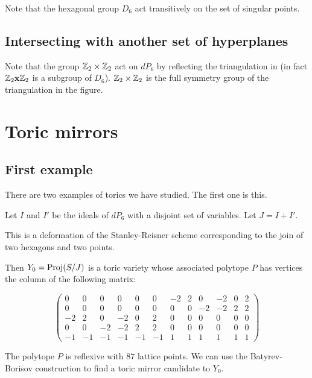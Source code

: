 \documentclass[11pt, english]{article}
\begin{document}
Note that the hexagonal group $D_6$ act transitively on the set of singular points.

\subsection{Intersecting with another set of hyperplanes}
\label{sec:delpezzoz2}

Note that the group $\mathbb{Z}_2 \times \mathbb{Z}_2$ act on $dP_6$ by reflecting the triangulation in  (in fact $\mathbb{Z}_2 \mathbf{x} \mathbb{Z}_2$ is a subgroup of $D_6$). $\mathbb{Z}_2 \times \mathbb{Z}_2$ is the full symmetry group of the triangulation in the figure.


\section{Toric mirrors}

\subsection{First example}
\label{sec:toric5}

There are two examples of torics we have studied. The first one is this.

Let $I$ and $I'$ be the ideals of $dP_6$ with a disjoint set of variables. Let $J=I+I'$.

\begin{remark}
This is a deformation of the Stanley-Reisner scheme corresponding to the join of two hexagons and two points.
\end{remark}

Then $Y_0 = \operatorname{Proj}(S/J)$ is a toric variety whose associated polytope $P$ has vertices the column of the following matrix:

\begin{equation}
\left(
\begin{array}{rrrrrrrrrrrr}
0 & 0 & 0 & 0 & 0 & 0 & -2 & 2 & 0 & -2 & 0 & 2 \\
0 & 0 & 0 & 0 & 0 & 0 & 0 & 0 & -2 & -2 & 2 & 2 \\
-2 & 2 & 0 & -2 & 0 & 2 & 0 & 0 & 0 & 0 & 0 & 0 \\
0 & 0 & -2 & -2 & 2 & 2 & 0 & 0 & 0 & 0 & 0 & 0 \\
-1 & -1 & -1 & -1 & -1 & -1 & 1 & 1 & 1 & 1 & 1 & 1
\end{array}
\right)
\end{equation}

The polytope $P$ is reflexive with $87$ lattice points. We can use the Batyrev-Borisov construction to find a toric mirror candidate to $Y_0$.
\end{document}
